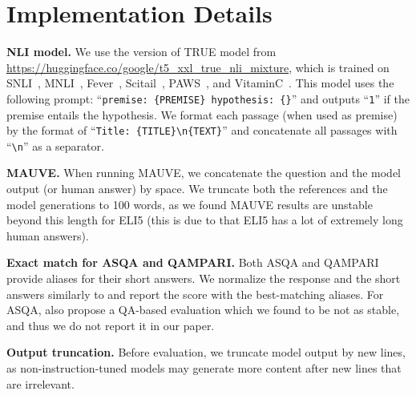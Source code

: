 \documentclass[11pt]{article}
\newcommand\ttt[1]{\texttt{#1}}
\renewcommand{\paragraph}[1]{\vspace{0.2cm}\noindent\textbf{#1}}
\begin{document}
\section{Implementation Details}
\label{app_sec:imp_details}

\paragraph{NLI model.} 
We use the version of TRUE model from \url{https://huggingface.co/google/t5_xxl_true_nli_mixture}, which is trained on 
SNLI~\citep{bowman2015large_snli},
MNLI~\citep{williams2018broad_mnli},
Fever~\citep{thorne-etal-2018-fever},
Scitail~\citep{khot2018scitail},
PAWS~\citep{zhang-etal-2019-paws},
and VitaminC~\citep{schuster-etal-2021-get}.
This model uses the following prompt: ``\ttt{premise: \{PREMISE\} hypothesis: \{\}}''
and outputs ``\texttt{1}'' if the premise entails the hypothesis.
We format each passage (when used as premise) 
by the format of ``\ttt{Title: \{TITLE\}\textbackslash{}n\{TEXT\}}'' and concatenate all passages with ``\ttt{\textbackslash{}n}'' as a separator. 




\paragraph{MAUVE.} 
When running MAUVE, we concatenate the question and the model output (or human answer) by space. 
We truncate both the references and the model generations to 100 words, 
as we found MAUVE results are unstable beyond this length for ELI5 (this is due to that ELI5 has a lot of extremely long human answers).

\paragraph{Exact match for ASQA and QAMPARI.}
Both ASQA and QAMPARI provide aliases for their short answers. 
We normalize the response and the short answers similarly to \citet{rajpurkar-etal-2016-squad}
and report the score with the best-matching aliases. 
For ASQA, \citet{stelmakh2022asqa} also propose a QA-based evaluation which we found to be not as stable, and thus we do not report it in our paper.



\paragraph{Output truncation.} 
Before evaluation,
we truncate model output by new lines, 
as non-instruction-tuned models may generate more content after new lines that are irrelevant. 
\end{document}
